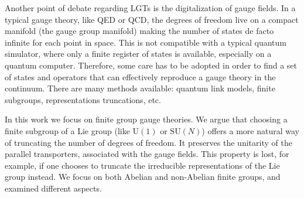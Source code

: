 Another point of debate regarding LGTs is the digitalization of gauge fields.
In a typical gauge theory, like QED or QCD, the degrees of freedom live on a compact manifold (the gauge group manifold) making the number of states de facto infinite for each point in space.
This is not compatible with a typical quantum simulator, where only a finite register of states is available, especially on a quantum computer.
Therefore, some care has to be adopted in order to find a set of states and operators that can effectively reproduce a gauge theory in the continuum.
There are many methods available: quantum link models, finite subgroups, representations truncations, etc.

\bigskip

In this work we focus on finite group gauge theories.
We argue that choosing a finite subgroup of a Lie group (like $\mathrm{U}(1)$ or $\mathrm{SU}(N)$) offers a more natural way of truncating the number of degrees of freedom.
It preserves the unitarity of the parallel transporters, associated with the gauge fields.
This property is lost, for example, if one chooses to truncate the irreducible representations of the Lie group instead.
We focus on both Abelian \cite{pradhan2022ladder} and non-Abelian \cite{pradhan_unpublished} finite groups, and examined different aspects.

\bigskip

